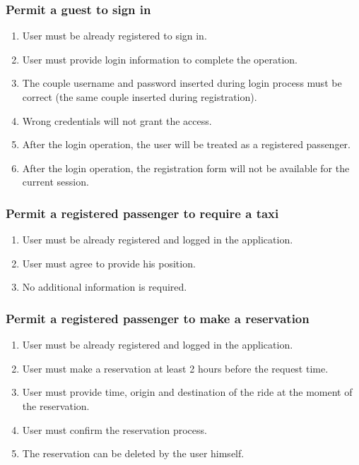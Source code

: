 		\subsubsection{Permit a guest to sign in}
			\begin{enumerate}[label=\bfseries R\arabic*:]
				\item User must be already registered to sign in.
				\item User must provide login information to complete the operation.
				\item The couple username and password inserted during login process must be correct
					(the same couple inserted during registration).
				\item Wrong credentials will not grant the access.
				\item After the login operation, the user will be treated as a registered passenger.
				\item After the login operation, the registration form will not be available for the current session.
			\end{enumerate}
		\subsubsection{Permit a registered passenger to require a taxi}
			\begin{enumerate}[label=\bfseries R\arabic*:]
				\item User must be already registered and logged in the application.
				\item User must agree to provide his position.
				\item No additional information is required.
			\end{enumerate}
		\subsubsection{Permit a registered passenger to make a reservation}
			\begin{enumerate}[label=\bfseries R\arabic*:]
				\item User must be already registered and logged in the application.
				\item User must make a reservation at least 2 hours before the request time.
				\item User must provide time, origin and destination of the ride at the moment of the reservation.
				\item User must confirm the reservation process.
				\item The reservation can be deleted by the user himself.
			\end{enumerate}
